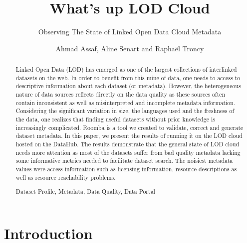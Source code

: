\documentclass[runningheads,a4paper]{llncs}
\newcommand{\keywords}[1]{\par\addvspace\baselineskip
\noindent\keywordname\enspace\ignorespaces#1}
\begin{document}
\title{What's up LOD Cloud}
\subtitle{Observing The State of Linked Open Data Cloud Metadata}

\author{Ahmad Assaf, Aline Senart and Rapha\"{e}l Troncy }



\maketitle


\begin{abstract}

Linked Open Data (LOD) has emerged as one of the largest collections of interlinked datasets on the web. In order to benefit from this mine of data, one needs to access to descriptive information about each dataset (or metadata). However, the heterogeneous nature of data sources reflects directly on the data quality as these sources often contain inconsistent as well as misinterpreted and incomplete metadata information. Considering the significant variation in size, the languages used and the freshness of the data, one realizes that finding useful datasets without prior knowledge is increasingly complicated. Roomba is a tool we created to validate, correct and generate dataset metadata. In this paper, we present the results of running it on the LOD cloud hosted on the DataHub. The results demonstrate that the general state of LOD cloud needs more attention as most of the datasets suffer from bad quality metadata lacking some informative metrics needed to facilitate dataset search. The noisiest metadata values were access information such as licensing information, resource descriptions as well as resource reachability problems.

\keywords{Dataset Profile, Metadata, Data Quality, Data Portal}
\end{abstract}


\section{Introduction}
\label{sec:introduction}
\end{document}

